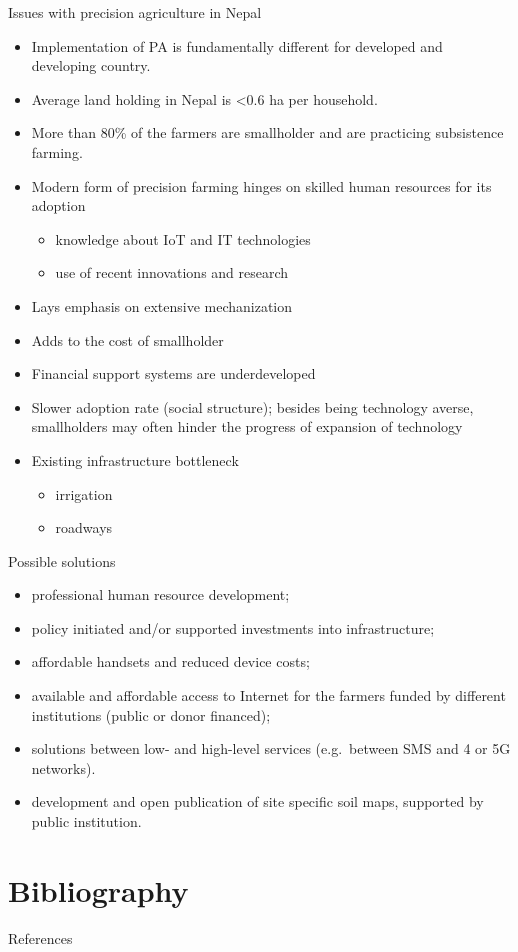 \documentclass[11pt,dvipsnames,ignorenonframetext,aspectratio=169]{beamer}
\providecommand{\tightlist}{%
  \setlength{\itemsep}{0pt}\setlength{\parskip}{0pt}}
\begin{document}
\begin{frame}{Issues with precision agriculture in Nepal}
\protect\hypertarget{issues-with-precision-agriculture-in-nepal}{}
\begin{itemize}
\tightlist
\item
  Implementation of PA is fundamentally different for developed and
  developing country.
\item
  Average land holding in Nepal is \textless0.6 ha per household.
\item
  More than 80\% of the farmers are smallholder and are practicing
  subsistence farming.
\item
  Modern form of precision farming hinges on skilled human resources for
  its adoption

  \begin{itemize}
  \tightlist
  \item
    knowledge about IoT and IT technologies
  \item
    use of recent innovations and research
  \end{itemize}
\item
  Lays emphasis on extensive mechanization
\item
  Adds to the cost of smallholder
\item
  Financial support systems are underdeveloped
\item
  Slower adoption rate (social structure); besides being technology
  averse, smallholders may often hinder the progress of expansion of
  technology
\item
  Existing infrastructure bottleneck

  \begin{itemize}
  \tightlist
  \item
    irrigation
  \item
    roadways
  \end{itemize}
\end{itemize}
\end{frame}

\begin{frame}{Possible solutions}
\protect\hypertarget{possible-solutions}{}
\begin{itemize}
\tightlist
\item
  professional human resource development;
\item
  policy initiated and/or supported investments into infrastructure;
\item
  affordable handsets and reduced device costs;
\item
  available and affordable access to Internet for the farmers funded by
  different institutions (public or donor financed);
\item
  solutions between low- and high-level services (e.g.~between SMS and 4
  or 5G networks).
\item
  development and open publication of site specific soil maps, supported
  by public institution.
\end{itemize}
\end{frame}

\hypertarget{bibliography}{%
\section{Bibliography}\label{bibliography}}

\begin{frame}{References}
\protect\hypertarget{references}{}
\end{frame}
\end{document}
